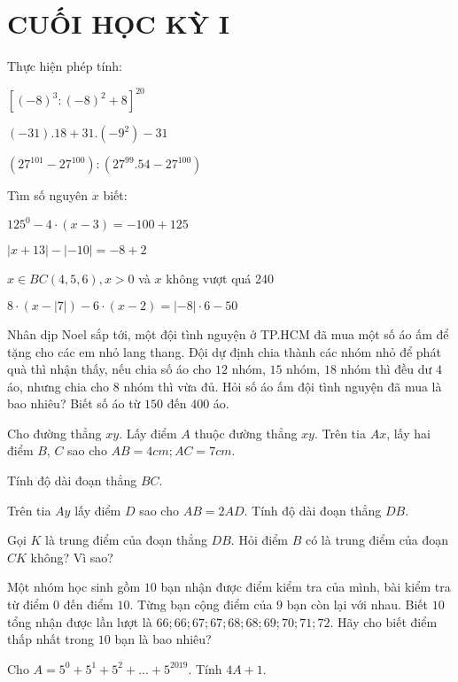 \section{CUỐI HỌC KỲ I}
\setcounter{ex}{0}
\begin{ex}
	Thực hiện phép tính:
	\begin{listEX}
	\item $\left[(-8)^{3}:(-8)^{2}+8\right]^{20}$
	\item $(-31) .18+31 .\left(-9^{2}\right)-31$
	\item $\left(27^{101}-27^{100}\right):\left(27^{99} .54-27^{100}\right)$
	\end{listEX}
\end{ex}
\begin{ex}
	Tìm số nguyên $x$ biết:
	\begin{listEX}[2]
	\item $125^{0}-4 \cdot(x-3)=-100+125$
	\item $|x+13|-|-10|=-8+2$
	\item $x \in B C(4,5,6), x>0$ và $x$ không vượt quá 240
	\item $8 \cdot(x-|7|)-6 \cdot(x-2)=|-8| \cdot 6-50$
	\end{listEX}
\end{ex}
\begin{ex}
	Nhân dịp Noel sắp tới, một đội tình nguyện ở TP.HCM đã mua một số áo ấm để tặng cho các em nhỏ lang thang. Đội dự định chia thành các nhóm nhỏ để phát quà thì nhận thấy, nếu chia số áo cho $12$ nhóm, $15$ nhóm, $18$ nhóm thì đều dư $4$ áo, nhưng chia cho $8$ nhóm thì vừa đủ. Hỏi số áo ấm đội tình nguyện đã mua là bao nhiêu? Biết số áo từ $150$ đến $400$ áo.
\end{ex}
\begin{ex}
	Cho đường thẳng $xy$. Lấy điểm $A$ thuộc đường thẳng $xy$. Trên tia $Ax$, lấy hai điểm $B$, $C$ sao cho $AB = 4cm; AC = 7cm$.
		\begin{listEX}
	\item Tính độ dài đoạn thẳng $BC$.
	\item Trên tia $Ay$ lấy điểm $D$ sao cho $AB = 2AD$. Tính độ dài đoạn thẳng $DB$.
	\item Gọi $K$ là trung điểm của đoạn thẳng $DB$. Hỏi điểm $B$ có là trung điểm của đoạn $CK$ không? Vì sao?
		\end{listEX}
\end{ex}
\begin{ex}
	Một nhóm học sinh gồm $10$ bạn nhận được điểm kiểm tra của mình, bài kiểm tra từ điểm $0$ đến điểm $10$. Từng bạn cộng điểm của $9$ bạn còn lại với nhau. Biết $10$ tổng nhận được lần lượt là $66; 66; 67; 67; 68; 68; 69; 70; 71; 72$. Hãy cho biết điểm thấp nhất trong $10$ bạn là bao nhiêu?
\end{ex}
\begin{ex}
	Cho $A=5^{0}+5^{1}+5^{2}+\ldots+5^{2019}$. Tính $4A+1$.
\end{ex}